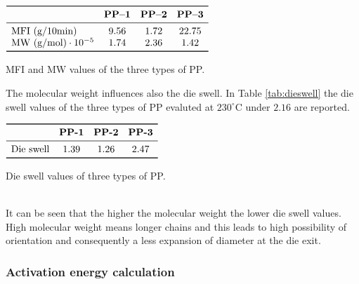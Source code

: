 \documentclass[a4paper, 11pt]{article}
\begin{document}
\begin{table}[htp]
\centering
$
\begin{array}{lccc}
\toprule
\text{} & \textbf{PP–1} & \textbf{PP–2} & \textbf{PP–3} \\
\midrule
\text{MFI (g/10min)} & 9.56 & 1.72 & 22.75  \\
\text{MW (g/mol)}\cdot 10^{-5} & 1.74 & 2.36 & 1.42 \\
\bottomrule
\end{array}
$
\caption{MFI and MW values of the three types of PP.}
\label{tab:mw}
\end{table}
\newpage
The molecular weight influences also the die swell. In Table \ref{tab:dieswell} the die swell values of the three types of PP evaluted at $230 ^\circ$C under $2.16$  are reported.
\begin{table}[htp]
\centering
$
\begin{array}{cccc}
\toprule
\text{} & \textbf{PP-1} & \textbf{PP-2} & \textbf{PP-3} \\
\midrule
\text{Die swell} & 1.39 & 1.26 & 2.47  \\
\bottomrule
\end{array}
$
\caption{Die swell values of three types of PP.}
\label{tab:dieswell}
\end{table}\\
It can be seen that the higher the molecular weight the lower die swell values. High molecular weight means longer chains and this leads to high possibility of orientation and consequently a less expansion of diameter at the die exit.

\subsubsection{Activation energy calculation}
\end{document}
